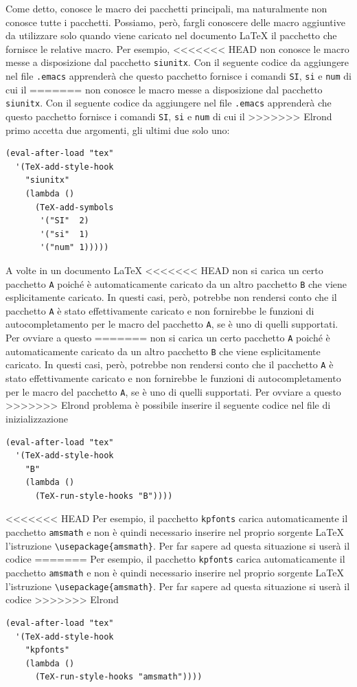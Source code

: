 \documentclass[11pt,a4paper]{article}
\begin{document}
Come detto, \auctex{}
conosce le macro dei pacchetti principali, ma naturalmente non conosce tutte i
pacchetti.  Possiamo, però, fargli conoscere delle macro aggiuntive da
utilizzare solo quando viene caricato nel documento \LaTeX{}
il pacchetto che fornisce le relative macro.  Per esempio, \auctex{}
<<<<<<< HEAD
non conosce le macro messe a disposizione dal pacchetto \texttt{siunitx}.  Con
il seguente codice da aggiungere nel file \texttt{.emacs} apprenderà che questo
pacchetto fornisce i comandi \texttt{SI}, \texttt{si} e \texttt{num} di cui il
=======
non conosce le macro messe a disposizione dal pacchetto \verb!siunitx!.  Con
il seguente codice da aggiungere nel file \verb!.emacs! apprenderà che questo
pacchetto fornisce i comandi \verb!SI!, \verb!si! e \verb!num! di cui il
>>>>>>> Elrond
primo accetta due argomenti, gli ultimi due solo uno:
\begin{Verbatim}
(eval-after-load "tex"
  '(TeX-add-style-hook
    "siunitx"
    (lambda ()
      (TeX-add-symbols
       '("SI"  2)
       '("si"  1)
       '("num" 1)))))
\end{Verbatim}
A volte in un documento \LaTeX{}
<<<<<<< HEAD
non si carica un certo pacchetto \texttt{A} poiché è automaticamente caricato da
un altro pacchetto \texttt{B} che viene esplicitamente caricato.  In questi
casi, però, \auctex{}
potrebbe non rendersi conto che il pacchetto \texttt{A} è stato effettivamente
caricato e non fornirebbe le funzioni di autocompletamento per le macro del
pacchetto \texttt{A}, se è uno di quelli supportati.  Per ovviare a questo
=======
non si carica un certo pacchetto \verb!A! poiché è automaticamente caricato da
un altro pacchetto \verb!B! che viene esplicitamente caricato.  In questi casi,
però, \auctex{}
potrebbe non rendersi conto che il pacchetto \verb!A! è stato effettivamente
caricato e non fornirebbe le funzioni di autocompletamento per le macro del
pacchetto \verb!A!, se è uno di quelli supportati.  Per ovviare a questo
>>>>>>> Elrond
problema è possibile inserire il seguente codice nel file di inizializzazione
\begin{Verbatim}
(eval-after-load "tex"
  '(TeX-add-style-hook
    "B"
    (lambda ()
      (TeX-run-style-hooks "B"))))
\end{Verbatim}
<<<<<<< HEAD
Per esempio, il pacchetto \texttt{kpfonts} carica automaticamente il pacchetto
\texttt{amsmath} e non è quindi necessario inserire nel proprio sorgente
\LaTeX{}
l'istruzione \texttt{\textbackslash{}usepackage\{amsmath\}}.  Per far sapere ad
\auctex{} questa situazione si userà il codice
=======
Per esempio, il pacchetto \verb!kpfonts! carica automaticamente il pacchetto
\verb!amsmath! e non è quindi necessario inserire nel proprio sorgente \LaTeX{}
l'istruzione \verb!\usepackage{amsmath}!.  Per far sapere ad \auctex{}
questa situazione si userà il codice
>>>>>>> Elrond
\begin{Verbatim}
(eval-after-load "tex"
  '(TeX-add-style-hook
    "kpfonts"
    (lambda ()
      (TeX-run-style-hooks "amsmath"))))
\end{Verbatim}
\end{document}
